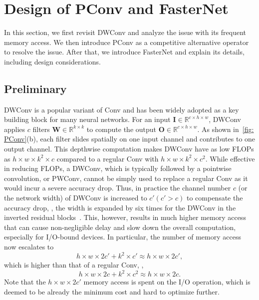 \section{Design of PConv and FasterNet}
\label{sec:approach}
In this section, we first revisit DWConv and analyze the issue with its frequent memory access. We then introduce PConv as a competitive alternative operator to resolve the issue. After that, we introduce FasterNet and explain its details, including design considerations. 

\subsection{Preliminary}
DWConv is a popular variant of Conv and has been widely adopted as a key building block for many neural networks. For an input 
$ \mathbf{I} \in \mathbb{R}^{ c \times h \times w}$, DWConv applies 
$c$
filters
$ \mathbf{W} \in \mathbb{R}^{ k \times k} $
to compute the output 
$ \mathbf{O} \in \mathbb{R}^{ c \times h \times w}$.
As shown in~\cref{fig: PConv}(b), each filter slides spatially on one input channel and contributes to one output channel.
This depthwise computation makes DWConv have as low FLOPs as $ h \times w \times k^2 \times c$ compared to a regular Conv with
$ h \times w \times k^2 \times c^2$. While effective in reducing FLOPs, a DWConv, which is typically followed by a pointwise convolution, or PWConv, cannot be simply used to replace a regular Conv as it would incur a severe accuracy drop.
Thus, in practice the channel number
$c$ (or the network width) of DWConv is increased to 
$c'\left(c' > c\right)$
to compensate the accuracy drop, \eg, the width is expanded by six
times for the DWConv in the inverted residual blocks~\cite{sandler2018mobilenetv2}. This, however, results in much higher memory access that can cause non-negligible delay and slow down the overall computation, especially for I/O-bound devices. In particular, the number of memory access now escalates to 
\begin{equation}
  h \times w \times 2c' + k^2 \times c'\approx h \times w \times 2c',
  \label{eq:memory_access_DWConv}
\end{equation}
which is higher than that of a regular Conv, \ie,
\begin{equation}
  h \times w \times 2c + k^2 \times c^2 \approx h \times w \times 2c.
  \label{eq:memory_access_Conv}
\end{equation}
Note that the $h \times w \times 2c'$ memory access is spent on the I/O operation, which is deemed to be already the minimum cost and hard to optimize further.

